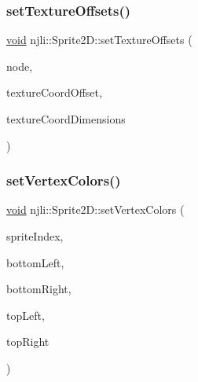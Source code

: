 \subsubsection{\texorpdfstring{set\+Texture\+Offsets()}{setTextureOffsets()}}
{\footnotesize\ttfamily \mbox{\hyperlink{_thread_8h_af1e856da2e658414cb2456cb6f7ebc66}{void}} njli\+::\+Sprite2\+D\+::set\+Texture\+Offsets (\begin{DoxyParamCaption}\item[{\mbox{\hyperlink{classnjli_1_1_node}{Node}} $\ast$}]{node,  }\item[{const bt\+Vector2 \&}]{texture\+Coord\+Offset,  }\item[{const bt\+Vector2 \&}]{texture\+Coord\+Dimensions }\end{DoxyParamCaption})}

\mbox{\label{classnjli_1_1_sprite2_d_a9e9b884bf7160977a67dc9e714827188}} 
\subsubsection{\texorpdfstring{set\+Vertex\+Colors()}{setVertexColors()}}
{\footnotesize\ttfamily \mbox{\hyperlink{_thread_8h_af1e856da2e658414cb2456cb6f7ebc66}{void}} njli\+::\+Sprite2\+D\+::set\+Vertex\+Colors (\begin{DoxyParamCaption}\item[{const \mbox{\hyperlink{_util_8h_ad758b7a5c3f18ed79d2fcd23d9f16357}{u64}}}]{sprite\+Index,  }\item[{const bt\+Vector4 \&}]{bottom\+Left,  }\item[{const bt\+Vector4 \&}]{bottom\+Right,  }\item[{const bt\+Vector4 \&}]{top\+Left,  }\item[{const bt\+Vector4 \&}]{top\+Right }\end{DoxyParamCaption})\hspace{0.3cm}{\ttfamily [protected]}}

\mbox{\label{classnjli_1_1_sprite2_d_a7265065dfeb76dc5e8ecf5f708469841}} 
